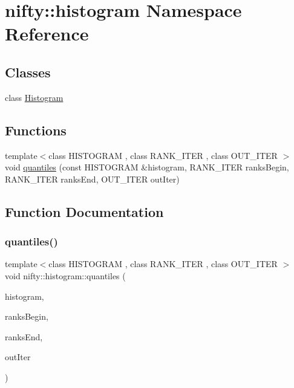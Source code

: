 \hypertarget{namespacenifty_1_1histogram}{}\section{nifty\+:\+:histogram Namespace Reference}
\label{namespacenifty_1_1histogram}
\subsection*{Classes}
\begin{DoxyCompactItemize}
\item 
class \hyperlink{classnifty_1_1histogram_1_1Histogram}{Histogram}
\end{DoxyCompactItemize}
\subsection*{Functions}
\begin{DoxyCompactItemize}
\item 
{\footnotesize template$<$class H\+I\+S\+T\+O\+G\+R\+AM , class R\+A\+N\+K\+\_\+\+I\+T\+ER , class O\+U\+T\+\_\+\+I\+T\+ER $>$ }\\void \hyperlink{namespacenifty_1_1histogram_a90fab0b73e5a31ec1e214921c36714c1}{quantiles} (const H\+I\+S\+T\+O\+G\+R\+AM \&histogram, R\+A\+N\+K\+\_\+\+I\+T\+ER ranks\+Begin, R\+A\+N\+K\+\_\+\+I\+T\+ER ranks\+End, O\+U\+T\+\_\+\+I\+T\+ER out\+Iter)
\end{DoxyCompactItemize}


\subsection{Function Documentation}
\mbox{\label{namespacenifty_1_1histogram_a90fab0b73e5a31ec1e214921c36714c1}} 
\subsubsection{\texorpdfstring{quantiles()}{quantiles()}}
{\footnotesize\ttfamily template$<$class H\+I\+S\+T\+O\+G\+R\+AM , class R\+A\+N\+K\+\_\+\+I\+T\+ER , class O\+U\+T\+\_\+\+I\+T\+ER $>$ \\
void nifty\+::histogram\+::quantiles (\begin{DoxyParamCaption}\item[{const H\+I\+S\+T\+O\+G\+R\+AM \&}]{histogram,  }\item[{R\+A\+N\+K\+\_\+\+I\+T\+ER}]{ranks\+Begin,  }\item[{R\+A\+N\+K\+\_\+\+I\+T\+ER}]{ranks\+End,  }\item[{O\+U\+T\+\_\+\+I\+T\+ER}]{out\+Iter }\end{DoxyParamCaption})}

